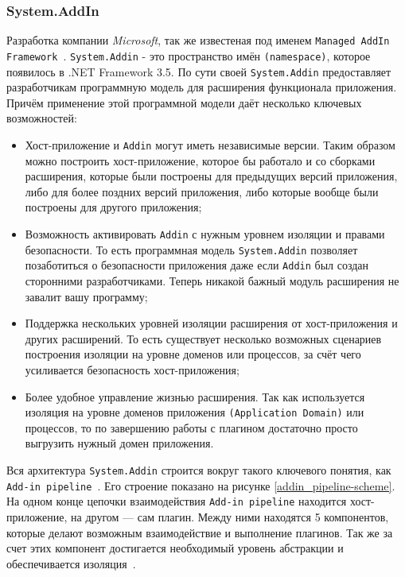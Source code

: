 \subsubsection{System.AddIn}
\label{sec:system_addin}

Разработка компании {\it Microsoft}, так же известеная под именем {\tt Managed AddIn Framework}~\cite{System.Addins-article, maf}. {\tt System.Addin} - это пространство имён {\tt(namespace)}, которое появилось в .NET Framework 3.5. По сути своей {\tt System.Addin} предоставляет разработчикам программную модель для расширения функционала приложения. Причём применение этой программной модели даёт несколько ключевых возможностей:

\begin{itemize}

  \item Хост-приложение и {\tt Addin} могут иметь независимые версии. Таким образом можно построить хост-приложение, которое бы работало и со сборками расширения, которые были построены для предыдущих версий приложения, либо для более поздних версий приложения, либо которые вообще были построены для другого приложения;

  \item Возможность активировать {\tt Addin} с нужным уровнем изоляции и правами безопасности. То есть программная модель {\tt System.Addin} позволяет позаботиться о безопасности приложения даже если {\tt Addin} был создан сторонними разработчиками. Теперь никакой бажный модуль расширения не завалит вашу программу;

  \item Поддержка нескольких уровней изоляции расширения от хост-приложения и других расширений. То есть существует несколько возможных сценариев построения изоляции на уровне доменов или процессов, за счёт чего усиливается безопасность хост-приложения;

  \item Более удобное управление жизнью расширения. Так как используется изоляция на уровне доменов приложения {\tt (Application Domain)} или процессов, то по завершению работы с плагином достаточно просто выгрузить нужный домен приложения.

\end{itemize}

Вся архитектура {\tt System.Addin} строится вокруг такого ключевого понятия, как {\tt Add-in pipeline}~\cite{addins1-article}. Его строение показано на рисунке \ref{addin_pipeline-scheme}. На одном конце цепочки взаимодействия {\tt Add-in pipeline} находится хост-приложение, на другом --- сам плагин. Между ними находятся 5 компонентов, которые делают возможным взаимодействие и выполнение плагинов. Так же за счет этих компонент достигается необходимый уровень абстракции и обеспечивается изоляция~\cite{use-systemaddin-namespace}.


